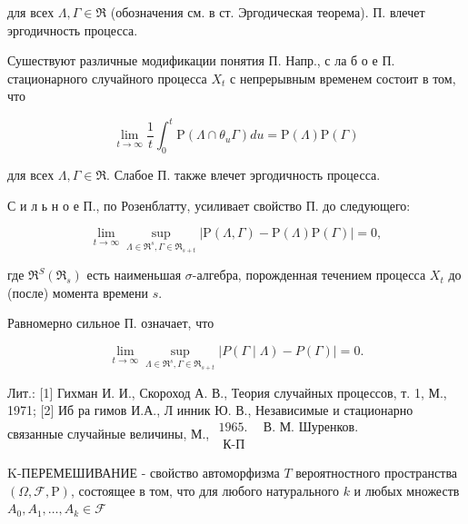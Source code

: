 \documentclass[10pt]{article}
\begin{document}
для всех $\Lambda, \Gamma \in \Re$ (обозначения см. в ст. Эргодическая теорема). П. влечет эргодичность процесса.



Сушествуют различные модификации понятия П. Напр., с ла б о е П. стационарного случайного процесса $X_{t}$ с непрерывным временем состоит в том, что



\[

\lim _{t \rightarrow \infty} \frac{1}{t} \int_{0}^{t} \mathrm{P}\left(\Lambda \cap \theta_{u} \Gamma\right) d u=\mathrm{P}(\Lambda) \mathrm{P}(\Gamma)

\]



для всех $\Lambda, \Gamma \in \Re$. Слабое П. также влечет эргодичность процесса.



С и л ь н о е П., по Розенблатту, усиливает свойство П. до следующего:



\[

\lim _{t \rightarrow \infty} \sup _{\Lambda \in \Re^{s}, \Gamma \in \Re_{s+t}}|\mathrm{P}(\Lambda, \Gamma)-\mathrm{P}(\Lambda) \mathrm{P}(\Gamma)|=0,

\]



где $\Re^{S}\left(\Re_{s}\right)$ есть наименьшая $\sigma$-алгебра, порожденная течением процесса $X_{t}$ до (после) момента времени $s$.



Равномерно сильное П. означает, что



\[

\lim _{t \rightarrow \infty} \sup _{\Lambda \in \mathfrak{R}^{s}, \Gamma \in \Re_{s+t}}|P(\Gamma \mid \Lambda)-P(\Gamma)|=0 .

\]



Лит.: [1] Гихман И. И., Скороход А. В., Теория случайных процессов, т. 1, М., 1971; [2] Иб ра гимов И.А., Л инник Ю. В., Независимые и стационарно связанные случайные величины, М., $\begin{array}{ll}1965 . & \text { В. М. Шуренков. } \\ \text { К-П }\end{array}$



K-ПЕРЕМЕШИВАНИЕ - свойство автоморфизма $T$ вероятностного пространства $(\Omega, \mathscr{F}, \mathrm{P})$, состоящее в том, что для любого натурального $k$ и любых множеств $A_{0}, A_{1}, \ldots, A_{k} \in \mathscr{F}$
\end{document}
